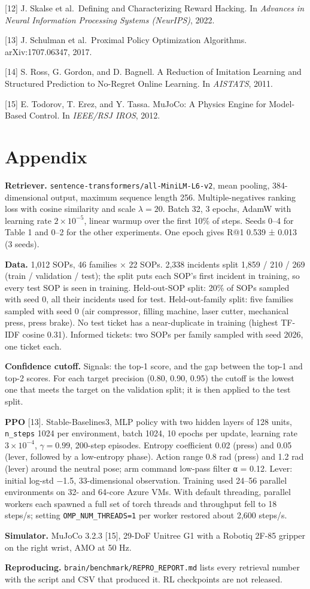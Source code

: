 \documentclass[
  10pt,
  twocolumn]{article}
\begin{document}
{[}12{]} J. Skalse et al.~Defining and Characterizing Reward Hacking. In
\emph{Advances in Neural Information Processing Systems (NeurIPS)},
2022.

{[}13{]} J. Schulman et al.~Proximal Policy Optimization Algorithms.
arXiv:1707.06347, 2017.

{[}14{]} S. Ross, G. Gordon, and D. Bagnell. A Reduction of Imitation
Learning and Structured Prediction to No-Regret Online Learning. In
\emph{AISTATS}, 2011.

{[}15{]} E. Todorov, T. Erez, and Y. Tassa. MuJoCo: A Physics Engine for
Model-Based Control. In \emph{IEEE/RSJ IROS}, 2012.

\section*{Appendix}\label{appendix}

\textbf{Retriever.} \texttt{sentence-transformers/all-MiniLM-L6-v2},
mean pooling, 384-dimensional output, maximum sequence length 256.
Multiple-negatives ranking loss with cosine similarity and scale
\(\lambda = 20\). Batch 32, 3 epochs, AdamW with learning rate
\(2 \times 10^{-5}\), linear warmup over the first 10\% of steps. Seeds
0--4 for Table 1 and 0--2 for the other experiments. One epoch gives R@1
0.539 ± 0.013 (3 seeds).

\textbf{Data.} 1,012 SOPs, 46 families × 22 SOPs. 2,338 incidents split
1,859 / 210 / 269 (train / validation / test); the split puts each SOP's
first incident in training, so every test SOP is seen in training.
Held-out-SOP split: 20\% of SOPs sampled with seed 0, all their
incidents used for test. Held-out-family split: five families sampled
with seed 0 (air compressor, filling machine, laser cutter, mechanical
press, press brake). No test ticket has a near-duplicate in training
(highest TF-IDF cosine 0.31). Informed tickets: two SOPs per family
sampled with seed 2026, one ticket each.

\textbf{Confidence cutoff.} Signals: the top-1 score, and the gap
between the top-1 and top-2 scores. For each target precision (0.80,
0.90, 0.95) the cutoff is the lowest one that meets the target on the
validation split; it is then applied to the test split.

\textbf{PPO} {[}13{]}. Stable-Baselines3, MLP policy with two hidden
layers of 128 units, \texttt{n\_steps} 1024 per environment, batch 1024,
10 epochs per update, learning rate \(3 \times 10^{-4}\),
\(\gamma = 0.99\), 200-step episodes. Entropy coefficient 0.02 (press)
and 0.05 (lever, followed by a low-entropy phase). Action range 0.8 rad
(press) and 1.2 rad (lever) around the neutral pose; arm command
low-pass filter α = 0.12. Lever: initial log-std −1.5, 33-dimensional
observation. Training used 24--56 parallel environments on 32- and
64-core Azure VMs. With default threading, parallel workers each spawned
a full set of torch threads and throughput fell to 18 steps/s; setting
\texttt{OMP\_NUM\_THREADS=1} per worker restored about 2,600 steps/s.

\textbf{Simulator.} MuJoCo 3.2.3 {[}15{]}, 29-DoF Unitree G1 with a
Robotiq 2F-85 gripper on the right wrist, AMO at 50 Hz.

\textbf{Reproducing.} \texttt{brain/benchmark/REPRO\_REPORT.md} lists
every retrieval number with the script and CSV that produced it. RL
checkpoints are not released.
\end{document}
